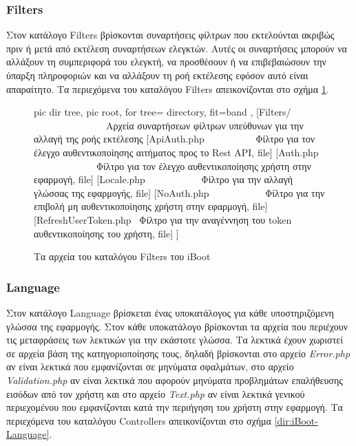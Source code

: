 \subsubsection{Filters} \label{ui:app:filters}
Στον κατάλογο Filters βρίσκονται συναρτήσεις φίλτρων που εκτελούνται ακριβώς πριν ή μετά από εκτέλεση συναρτήσεων ελεγκτών. Αυτές οι συναρτήσεις μπορούν να αλλάξουν τη συμπεριφορά του ελεγκτή, να προσθέσουν ή να επιβεβαιώσουν την ύπαρξη πληροφοριών και να αλλάξουν τη ροή εκτέλεσης εφόσον αυτό είναι απαραίτητο. Τα περιεχόμενα του καταλόγου Filters απεικονίζονται στο σχήμα \ref{dir:iBoot-Filters}.

\begin{figure}
	\centering
	{\footnotesize
		\begin{forest}
			pic dir tree,
			pic root,
			for tree={%
				directory,
				fit=band
			},
			[Filters/ \ \ \ \ \ \ \ \ \ \ \ \ \ \ \ Αρχεία συναρτήσεων φίλτρων υπεύθυνων για την αλλαγή της ροής εκτέλεσης
				[ApiAuth.php \ \ \ \ \ \ \ \ \ \ Φίλτρο για τον έλεγχο αυθεντικοποίησης αιτήματος προς το Rest API, file]
				[Auth.php \ \ \ \ \ \ \ \ \ \ \ \ \ Φίλτρο για τον έλεγχο αυθεντικοποίησης χρήστη στην εφαρμογή, file]
				[Locale.php \ \ \ \ \ \ \ \ \ \ \ Φίλτρο για την αλλαγή γλώσσας της εφαρμογής, file]
				[NoAuth.php \ \ \ \ \ \ \ \ \ \ \ Φίλτρο για την επιβολή μη αυθεντικοποίησης χρήστη στην εφαρμογή, file]
				[RefreshUserToken.php \ Φίλτρο για την αναγέννηση του token αυθεντικοποίησης του χρήστη, file]
			]
		\end{forest}
	}
	\caption{Τα αρχεία του καταλόγου Filters του iBoot}
	\label{dir:iBoot-Filters}
\end{figure}

\subsubsection{Language} \label{ui:app:language}
Στον κατάλογο Language βρίσκεται ένας υποκατάλογος για κάθε υποστηριζόμενη γλώσσα της εφαρμογής. Στον κάθε υποκατάλογο βρίσκονται τα αρχεία που περιέχουν τις μεταφράσεις των λεκτικών για την εκάστοτε γλώσσα. Τα λεκτικά έχουν χωριστεί σε αρχεία βάση της κατηγοριοποίησης τους, δηλαδή βρίσκονται στο αρχείο \emph{Error.php} αν είναι λεκτικά που εμφανίζονται σε μηνύματα σφαλμάτων, στο αρχείο \emph{Validation.php} αν είναι λεκτικά που αφορούν μηνύματα προβλημάτων επαλήθευσης εισόδων από τον χρήστη και στο αρχείο \emph{Text.php} αν είναι λεκτικά γενικού περιεχομένου που εμφανίζονται κατά την περιήγηση του χρήστη στην εφαρμογή. Τα περιεχόμενα του καταλόγου Controllers απεικονίζονται στο σχήμα \ref{dir:iBoot-Language}.

